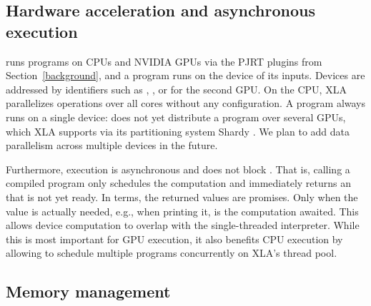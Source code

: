 \documentclass[article,shortnames]{jss}
\begin{document}
\subsection{Hardware acceleration and asynchronous execution}\label{hardware}

 runs programs on CPUs and NVIDIA GPUs via the PJRT plugins from Section~\ref{background}, and a program runs on the device of its inputs.
Devices are addressed by identifiers such as , , or  for the second GPU.
On the CPU, XLA parallelizes operations over all cores without any configuration.
A program always runs on a single device:  does not yet distribute a program over several GPUs, which XLA supports via its partitioning system Shardy \citep{ref-shardy}.
We plan to add data parallelism across multiple devices in the future.

Furthermore, execution is asynchronous and does not block .
That is, calling a compiled program only schedules the computation and immediately returns an  that is not yet ready.
In  terms, the returned values are promises.
Only when the value is actually needed, e.g., when printing it, is the computation awaited.
This allows device computation to overlap with the single-threaded  interpreter.
While this is most important for GPU execution, it also benefits CPU execution by allowing  to schedule multiple programs concurrently on XLA's thread pool.

\subsection{Memory management}\label{memory}
\end{document}

